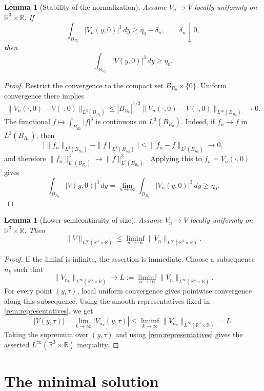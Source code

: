 \documentclass[11pt]{amsart}
\theoremstyle{plain}
\newtheorem{lemma}[theorem]{Lemma}
\theoremstyle{definition}
\theoremstyle{remark}
\numberwithin{equation}{section}
\begin{document}
\begin{lemma}[Stability of the normalization]\label{lem:nonzero-stability}
Assume \(V_n\to V\) locally uniformly on \(\mathbb R^3\times\mathbb R\).  If
\[
   \int_{B_{R_0}}|V_n(y,0)|^3\,dy\ge \eta_0-\delta_n,
   \qquad \delta_n\downarrow0,
\]
then
\[
   \int_{B_{R_0}}|V(y,0)|^3\,dy\ge \eta_0 .
\]
\end{lemma}

\begin{proof}
Restrict the convergence to the compact set
\(\overline{B_{R_0}}\times\{0\}\).  Uniform convergence there implies
\[
   \|V_n(\cdot,0)-V(\cdot,0)\|_{L^3(B_{R_0})}
   \le
   |B_{R_0}|^{1/3}
   \|V_n(\cdot,0)-V(\cdot,0)\|_{L^\infty(B_{R_0})}
   \to0 .
\]
The functional \(f\mapsto\int_{B_{R_0}}|f|^3\) is continuous on
\(L^3(B_{R_0})\).  Indeed, if \(f_n\to f\) in \(L^3(B_{R_0})\), then
\[
   \bigl|\|f_n\|_{L^3(B_{R_0})}-\|f\|_{L^3(B_{R_0})}\bigr|
   \le \|f_n-f\|_{L^3(B_{R_0})}\to0,
\]
and therefore \(\|f_n\|_{L^3(B_{R_0})}^3\to\|f\|_{L^3(B_{R_0})}^3\).  Applying
this to \(f_n=V_n(\cdot,0)\) gives
\[
   \int_{B_{R_0}}|V(y,0)|^3\,dy
   =
   \lim_{n\to\infty}\int_{B_{R_0}}|V_n(y,0)|^3\,dy
   \ge\eta_0 .
\]
\end{proof}

\begin{lemma}[Lower semicontinuity of size]\label{lem:lsc}
Assume \(V_n\to V\) locally uniformly on \(\mathbb R^3\times\mathbb R\).  Then
\[
   \|V\|_{L^\infty(\mathbb R^3\times\mathbb R)}
   \le
   \liminf_{n\to\infty}
   \|V_n\|_{L^\infty(\mathbb R^3\times\mathbb R)} .
\]
\end{lemma}

\begin{proof}
If the liminf is infinite, the assertion is immediate.
Choose a subsequence \(n_k\) such that
\[
   \|V_{n_k}\|_{L^\infty(\mathbb R^3\times\mathbb R)}
   \to
   L:=
   \liminf_{n\to\infty}
   \|V_n\|_{L^\infty(\mathbb R^3\times\mathbb R)} .
\]
For every point \((y,\tau)\), local uniform convergence gives pointwise
convergence along this subsequence.  Using the smooth representatives fixed in
\cref{rem:representatives}, we get
\[
   |V(y,\tau)|
   =
   \lim_{k\to\infty}|V_{n_k}(y,\tau)|
   \le
   \liminf_{k\to\infty}
   \|V_{n_k}\|_{L^\infty(\mathbb R^3\times\mathbb R)}
   =L .
\]
Taking the supremum over \((y,\tau)\) and using
\cref{rem:representatives} gives the asserted
\(L^\infty(\mathbb R^3\times\mathbb R)\) inequality.
\end{proof}

\section{The minimal solution}
\end{document}
